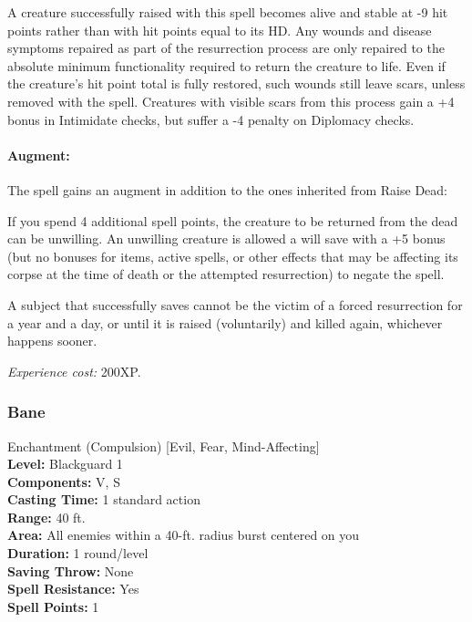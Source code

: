 A creature successfully raised with this spell becomes alive and stable at -9 hit points rather than with hit points equal to its HD. Any wounds and disease symptoms repaired as part of the resurrection process are only repaired to the absolute minimum functionality required to return the creature to life. Even if the creature's hit point total is fully restored, such wounds still leave scars, unless removed with the  spell. Creatures with visible scars from this process gain a +4 bonus in Intimidate checks, but suffer a -4 penalty on Diplomacy checks.

\paragraph{Augment:} The spell gains an augment in addition to the ones inherited from Raise Dead:
\begin{list}{}{\leftmargin=1em}
 \item If you spend 4 additional spell points, the creature to be returned from the dead can be unwilling.
An unwilling creature is allowed a will save with a +5 bonus 
(but no bonuses for items, active spells, or other effects 
that may be affecting its corpse at the time of death or the attempted resurrection)
to negate the spell.

A subject that successfully saves cannot be the victim of a forced resurrection for a year and a day, 
or until it is raised (voluntarily) and killed again, whichever happens sooner.
\end{list}

\emph{Experience cost:} 200XP.
\subsubsection{Bane}
\label{Spell:Bane}
Enchantment (Compulsion) [Evil, Fear, Mind-Affecting]
\\ \textbf{Level:} Blackguard 1
\\ \textbf{Components:} V, S
\\ \textbf{Casting Time:} 1 standard action
\\ \textbf{Range:} 40 ft.
\\ \textbf{Area:} All enemies within a 40-ft. radius burst centered on you
\\ \textbf{Duration:} 1 round/level
\\ \textbf{Saving Throw:} None
\\ \textbf{Spell Resistance:} Yes
\\ \textbf{Spell Points:} 1


